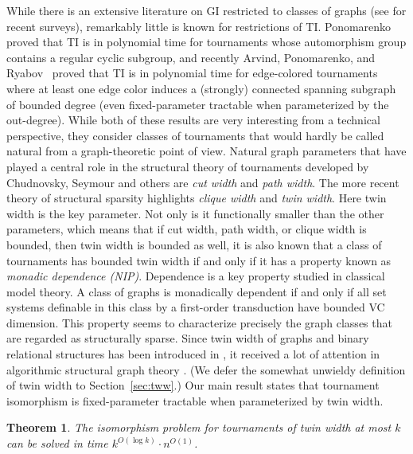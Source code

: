 \PassOptionsToPackage{dvipsnames,svgnames}{xcolor}\documentclass[10pt,a4paper]{article}
\newtheorem{theorem}{Theorem}[section]
\begin{document}
While there is an extensive literature on GI restricted to classes of graphs (see \cite{GroheN21,Neuen26} for recent surveys), remarkably little is known for restrictions of TI.
Ponomarenko \cite{Ponomarenko92} proved that TI is in polynomial time for tournaments whose automorphism group contains a regular cyclic subgroup,
and recently Arvind, Ponomarenko, and Ryabov~\cite{ArvindPR25} proved that TI is in polynomial time for edge-colored tournaments where at least one edge color induces a (strongly) connected spanning subgraph of bounded degree (even fixed-parameter tractable when parameterized by the out-degree).
While both of these results are very interesting from a technical perspective, they consider classes of tournaments that would hardly be called natural from a graph-theoretic point of view.
Natural graph parameters that have played a central role in the structural theory of tournaments developed by Chudnovsky, Seymour and others \cite{ChudnovskyFS12,ChudnovskyKLST18,ChudnovskySS19,ChudnovskyS11,FominP19} are \emph{cut width} and \emph{path width}.
The more recent theory of structural sparsity \cite{GajarskyKNMPST20,GajarskyPT22,NesetrilO16,NesetrilMS22} highlights \emph{clique width} and \emph{twin width}.
Here twin width is the key parameter.
Not only is it functionally smaller than the other parameters, which means that if cut width, path width, or clique width is bounded, then twin width is bounded as well, it is also known \cite{GenietT26} that a class of tournaments has bounded twin width if and only if it has a property known as \emph{monadic dependence (NIP)}.
Dependence is a key property studied in classical model theory.
A class of graphs is monadically dependent if and only if all set systems definable in this class by a first-order transduction have bounded VC dimension.
This property seems to characterize precisely the graph classes that are regarded as structurally sparse.
Since twin width of graphs and binary relational structures has been introduced in \cite{BonnetKTW22}, it received a lot of attention in algorithmic structural graph theory
\cite{BonnetGKTW22,BonnetGKTW24,BonnetGMSTT24,BonnetGMT23,BonnetKRT22,BonnetKRTW22,GajarskyPT22,GanianPSSS22,GenietT26,HlinenyJ25,Thomasse22}.
(We defer the somewhat unwieldy definition of twin width to Section~\ref{sec:tww}.)
Our main result states that tournament isomorphism is fixed-parameter tractable when parameterized by twin width.

\begin{theorem}
 \label{thm:tww-isomorphism-intro}
 The isomorphism problem for tournaments of twin width at most $k$ can be solved in time $k^{O(\log k)}\cdot n^{O(1)}$.
\end{theorem}
\end{document}
